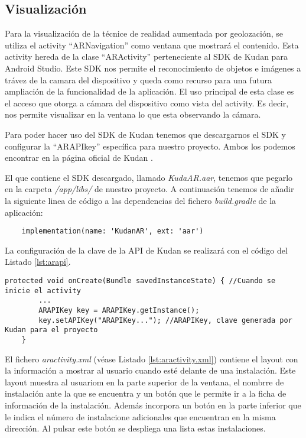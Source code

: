 \subsection{Visualización}

Para la visualización de la técnice de realidad aumentada por geolozación, se utiliza el activity ``ARNavigation''
como ventana que mostrará el contenido. Esta activity hereda de la clase ``ARActivity'' perteneciente al  SDK de Kudan para Android Studio. Este SDK nos permite el reconocimiento de objetos e imágenes a trávez de la camara del dispositivo y queda como recurso para una futura ampliación de la funcionalidad de la aplicación. El uso principal de esta clase es el acceso que otorga a cámara del dispositivo como vista del activity. Es decir, nos permite visualizar en la ventana lo que esta observando la cámara.

Para poder hacer uso del SDK de Kudan tenemos que descargarnos el SDK y configurar la ``ARAPIkey'' específica para nuestro proyecto. Ambos los podemos encontrar en la página oficial de Kudan \cite{URL::kudan}. 

El que contiene el SDK descargado, llamado \textit{KudaAR.aar}, tenemos que pegarlo en la carpeta \textit{/app/libs/} de nuestro proyecto. A continuación tenemos de añadir la siguiente linea de código a las dependencias del fichero \textit{build.gradle} de la aplicación:

\begin{lstlisting}
    implementation(name: 'KudanAR', ext: 'aar')
\end{lstlisting}

La configuración de la clave de la API de Kudan se realizará con el código del Listado \ref{lst:arapi}.
\begin{lstlisting}[caption={Fichero \textit{ARNavigation.java''}. Código para configurar la API de Kudan.},  label={lst:arapi}]
    protected void onCreate(Bundle savedInstanceState) { //Cuando se inicie el activity
        ...
        ARAPIKey key = ARAPIKey.getInstance(); 
        key.setAPIKey("ARAPIKey..."); //ARAPIKey, clave generada por Kudan para el proyecto
    }
\end{lstlisting}
 
El fichero \textit{aractivity.xml} (véase Listado \ref{lst:aractivity.xml}) contiene el layout con la información a mostrar al usuario cuando esté delante de una instalación. Este layout muestra al usuariom en la parte superior de la ventana, el nombrre de instalación ante la que se encuentra y un botón que le permite ir a la ficha de información de la instalación. Además incorpora un botón en la parte inferior que le indica el número de instalacione adicionales que encuentran en la misma dirección. Al pulsar este botón se despliega una lista estas instalaciones.

